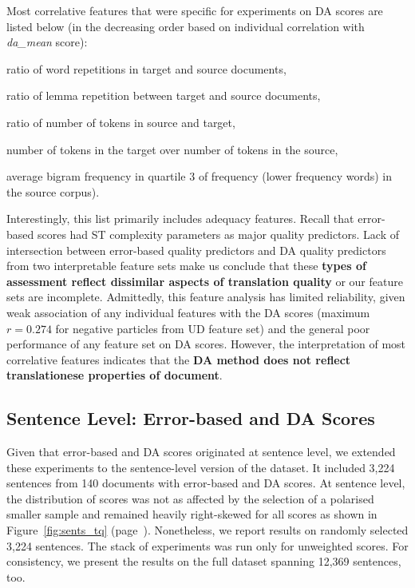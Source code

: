 Most correlative features that were specific for experiments on DA scores are listed below (in the decreasing order based on individual correlation with \textit{da\_mean} score): 
\begin{description}\compresslist{}
	\item[9992] ratio of word repetitions in target and source documents,
	\item[9993] ratio of lemma repetition between target and source documents,
	\item[1003] ratio of number of tokens in source and target,
	\item[1004] number of tokens in the target over number of tokens in the source,
	\item[1052] average bigram frequency in quartile 3 of frequency (lower frequency words) in the source corpus).
\end{description}

Interestingly, this list primarily includes adequacy features. Recall that error-based scores had ST complexity parameters as major quality predictors. 
Lack of intersection between error-based quality predictors and DA quality predictors from two interpretable feature sets make us conclude that these \textbf{types of assessment reflect dissimilar aspects of translation quality} or our feature sets are incomplete. 
Admittedly, this feature analysis has limited reliability, given weak association of any individual features with the DA scores (maximum $r=0.274$ for negative particles from UD feature set) and the general poor performance of any feature set on DA scores. 
However, the interpretation of most correlative features indicates that the \textbf{DA method does not reflect translationese properties of document}.
\vspace{-1.2em}

\subsection{\label{ssec:sent_level}Sentence Level: Error-based and DA Scores}
Given that error-based and DA scores originated at sentence level, we extended these experiments to the sentence-level version of the dataset. It included 3,224 sentences from 140 documents with error-based and DA scores. At sentence level, the distribution of scores was not as affected by the selection of a polarised smaller sample and remained heavily right-skewed for all scores as shown in Figure~\ref{fig:sents_tq} (page~\pageref{fig:sents_tq}). Nonetheless, we report results on randomly selected 3,224 sentences. The stack of experiments was run only for unweighted scores. For consistency, we present the results on the full dataset spanning 12,369 sentences, too.

